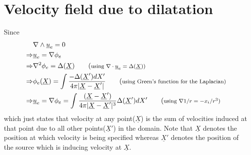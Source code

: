 \documentclass[11pt,a4paper]{article}
\newcommand{\vect}[1]{\underline{#1}}
\newcommand{\1}{\vect{1}}
\newcommand{\grad}{\nabla}
\newcommand{\curl}[1]{\nabla\wedge\vect{#1}}
\newcommand{\divg}[1]{\nabla\cdot\vect{#1}}
\newcommand{\RA}{\Rightarrow}
\newcommand{\DX}{\Delta(\vect X)}
\newcommand{\DXp}{\Delta(\vect X')}
\newcommand{\smalltag}[1]{\tag{\footnotesize{#1}}}
\begin{document}
\section{Velocity field due to dilatation}
Since
\begin{align*}
&\curl u_e = 0\\
\RA& \vect u_e = \grad \phi_e\\
\RA& \grad^2 \phi_e = \DX \tag{\footnotesize{using $\divg u_e = \DX$}}\\
\RA& \phi_e (\vect X)= \int\frac{-\DXp dX'}{4\pi|\vect X - \vect X'|} \smalltag{using Green's function for the Laplacian}\\
\RA& \vect u_e = \grad\phi_e = \int\frac{(\vect X - \vect X')}{4\pi|\vect X - \vect X'|^3}\DXp dX'\tag{\footnotesize{using $\grad 1/r = -x_i/r^3 $}}
\end{align*}
which just states that velocity at any point($\vect X$) is the sum of velocities induced at that point due to all other points($\vect X'$) in the domain. Note that $\vect X$ denotes the position at which velocity is being specified whereas $\vect X'$ denotes the position of the source which is inducing velocity at $\vect X$.
\end{document}
